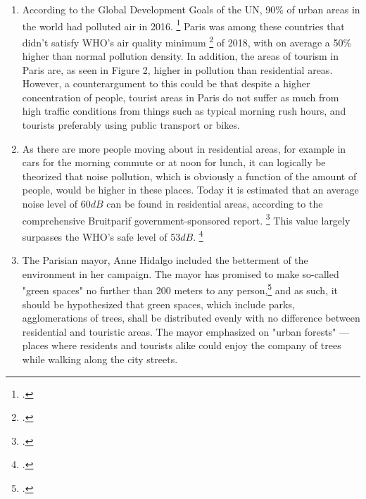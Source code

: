 \documentclass[11pt,letterpaper]{article}
\begin{document}
\begin{enumerate}
    \item According to the Global Development Goals of the UN, 90\% of urban areas in the world had polluted air in 2016. \footcite{sdg_report_2020} Paris was among these countries that didn't satisfy WHO's air quality minimum \footcite{ambient_outdoor_air_pollution_2018} of 2018, with on average a 50\% higher than normal pollution density. In addition, the areas of tourism in Paris are, as seen in Figure 2, higher in pollution than residential areas. However, a counterargument to this could be that despite a higher concentration of people, tourist areas in Paris do not suffer as much from high traffic conditions from things such as typical morning rush hours, and tourists preferably using public transport or bikes.

    \item As there are more people moving about in residential areas, for example in cars for the morning commute or at noon for lunch, it can logically be theorized that noise pollution, which is obviously a function of the amount of people, would be higher in these places. Today it is estimated that an average noise level of $60dB$ can be found in residential areas, according to the comprehensive Bruitparif government-sponsored report. \footcite{bruitparif} This value largely surpasses the WHO's safe level of $53dB$. \footcite{who_noise_guidelines} 
    
    \item The Parisian mayor, Anne Hidalgo included the betterment of the environment in her campaign. The mayor has promised to make so-called "green spaces" no further than 200 meters to any person,\footcite{anne_hidalgo_2020} and as such, it should be hypothesized that green spaces, which include parks, agglomerations of trees, shall be distributed evenly with no difference between residential and touristic areas. The mayor emphasized on "urban forests" --- places where residents and tourists alike could enjoy the company of trees while walking along the city streets. 
\end{enumerate}
\end{document}
